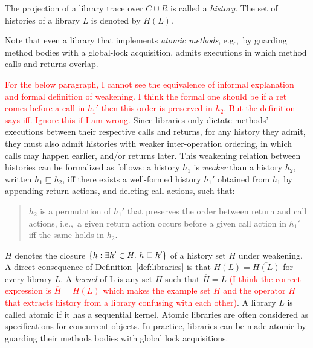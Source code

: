 The projection of a library trace over $C\cup R$ is called a \emph{history}. The set of histories of a library $L$ is denoted by $H(L)$.

Note that even a library that implements \emph{atomic methods}, e.g.,~by
guarding method bodies with a global-lock acquisition, admits executions in
which method calls and returns overlap. 

\textcolor{red}{For the below paragraph, I cannot see the equivalence  of informal explanation and formal definition of weakening. I think the formal one should be if a ret comes before a call in $h_1'$ then this order is preserved in $h_2$. But the definition says iff. Ignore this if I am wrong.}
Since libraries only dictate methods’ executions between their respective calls and returns, for any history they admit, they must also 
admit histories with weaker inter-operation ordering, in which calls may happen earlier, and/or returns later. This weakening relation
between histories can be formalized as follows: a history $h_1$ is \emph{weaker} than a history $h_2$, written $h_1 \sqsubseteq h_2$, 
if{f} there exists a well-formed history $h_1'$
obtained from $h_1$ by appending return actions, and deleting call actions,
such that:
\begin{quote}

  $h_2$ is a permutation of $h_1'$ that preserves the order between
  return and call actions, i.e.,~a given return action occurs before a given
  call action in $h_1'$ if{f} the same holds in $h_2$.

\end{quote}

$\overline{H}$ denotes the closure ${\{ h: \exists h' \in H.\ h \sqsubseteq h' \}}$ of a 
history set $H$ under weakening.
A direct consequence of Definition~\ref{def:libraries} is that $H(L)=\overline{H(L)}$ for
every library $L$. A \emph{kernel} of L is any set $H$ such that $\overline{H} = L$ \textcolor{red}{(I think the correct expression is $\overline{H} = H(L)$ which makes the example set $H$ and the operator $H$  that extracts history from a library confusing with each other)}.
A library $L$ is called atomic if it has a sequential kernel. 
Atomic libraries are often considered as specifications for concurrent objects. 
In practice, libraries can be made atomic by guarding their methods bodies with global lock acquisitions.


